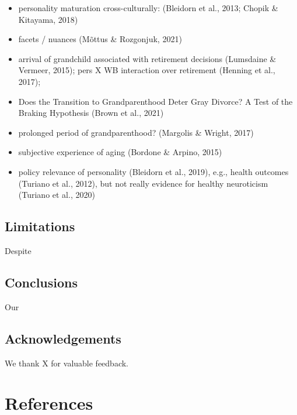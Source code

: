 \documentclass[
  english,
  man, noextraspace]{apa7}
\begin{document}
\begin{itemize}
\item
  personality maturation cross-culturally: (Bleidorn et al., 2013; Chopik \& Kitayama, 2018)
\item
  facets / nuances (Mõttus \& Rozgonjuk, 2021)
\item
  arrival of grandchild associated with retirement decisions (Lumsdaine \& Vermeer, 2015); pers X WB interaction over retirement (Henning et al., 2017);
\item
  Does the Transition to Grandparenthood Deter Gray Divorce? A Test of the Braking Hypothesis (Brown et al., 2021)
\item
  prolonged period of grandparenthood? (Margolis \& Wright, 2017)
\item
  subjective experience of aging (Bordone \& Arpino, 2015)
\item
  policy relevance of personality (Bleidorn et al., 2019), e.g., health outcomes (Turiano et al., 2012), but not really evidence for healthy neuroticism (Turiano et al., 2020)
\end{itemize}

\hypertarget{limitations}{%
\subsection{Limitations}\label{limitations}}

Despite

\hypertarget{conclusions}{%
\subsection{Conclusions}\label{conclusions}}

Our

\hypertarget{acknowledgements}{%
\subsection{Acknowledgements}\label{acknowledgements}}

We thank X for valuable feedback.

\newpage

\hypertarget{references}{%
\section{References}\label{references}}

\begingroup
\setlength{\parindent}{-0.5in}
\setlength{\leftskip}{0.5in}
\end{document}
